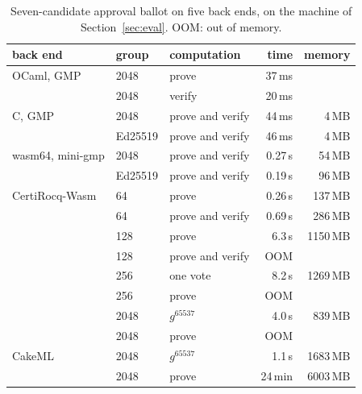 \begin{table}[h]
  \caption{Seven-candidate approval ballot on five back ends, on the
  machine of Section~\ref{sec:eval}. OOM: out of memory.}
  \label{tab:backends}
  \centering\scriptsize\setlength{\tabcolsep}{3pt}
  \begin{tabular}{@{}lllrr@{}}
    \toprule
    back end & group & computation & time & memory \\
    \midrule
    OCaml, GMP & 2048 & prove & 37\,ms & \\
    & 2048 & verify & 20\,ms & \\
    C, GMP & 2048 & prove and verify & 44\,ms & 4\,MB \\
    & Ed25519 & prove and verify & 46\,ms & 4\,MB \\
    wasm64, mini-gmp & 2048 & prove and verify & 0.27\,s & 54\,MB \\
    & Ed25519 & prove and verify & 0.19\,s & 96\,MB \\
    CertiRocq-Wasm & 64 & prove & 0.26\,s & 137\,MB \\
    & 64 & prove and verify & 0.69\,s & 286\,MB \\
    & 128 & prove & 6.3\,s & 1150\,MB \\
    & 128 & prove and verify & OOM & \\
    & 256 & one vote & 8.2\,s & 1269\,MB \\
    & 256 & prove & OOM & \\
    & 2048 & $g^{65537}$ & 4.0\,s & 839\,MB \\
    & 2048 & prove & OOM & \\
    CakeML & 2048 & $g^{65537}$ & 1.1\,s & 1683\,MB \\
    & 2048 & prove & 24\,min & 6003\,MB \\
    \bottomrule
  \end{tabular}
\end{table}
